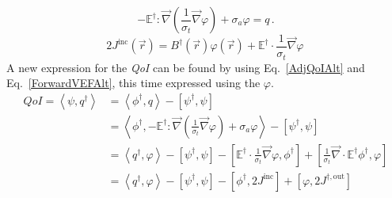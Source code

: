 \documentclass[12pt]{report}
\newcommand{\vr}{\vec{r}}
\newcommand{\bra}{\left\langle}
\newcommand{\ket}{\right\rangle}
\newcommand{\sbra}{\left[}
\newcommand{\sket}{\right]}
\renewcommand{\div}{\vec{\nabla} \cdot}
\newcommand{\grad}{\vec{\nabla}}
\newcommand{\Edd}{\mathbb{E}}
\newcommand{\BEdd}{B}
\newcommand{\sigt}{\sigma_t}
\newcommand{\siga}{\sigma_a}
\newcommand{\angSource}{q}
\newcommand{\scalSource}{q}
\newcommand{\qoi}{{\it QoI}\xspace}
\begin{document}
\begin{equation}
\label{ForwardVEFAlt}
- \Edd^\dag : \grad \left( \frac{1}{\sigt}\grad \varphi \right) + \siga \varphi  = \scalSource  \,.
\end{equation}
\begin{equation}
2 J^{\text{inc}}(\vr) = \BEdd^\dag(\vr) \varphi(\vr) + \Edd^\dag \cdot \frac{1}{\sigt} \grad \varphi  \,
\end{equation} 
A new expression for the \qoi can be found by using Eq.~\eqref{AdjQoIAlt} and Eq.~\eqref{ForwardVEFAlt}, this time expressed using the $\varphi$.
 \begin{equation}
\label{AdjQoIAltExpand}
\begin{split}
QoI = \bra \psi , \angSource^\dag \ket &= \bra \phi^\dag , \angSource \ket - \sbra \psi^\dag,  \psi \sket \\
&= \bra \phi^\dag , - \Edd^\dag : \grad \left( \frac{1}{\sigt}\grad \varphi \right) + \siga \varphi \ket - \sbra \psi^\dag,  \psi \sket \\
&= \bra q^\dag ,\varphi \ket - \sbra \psi^\dag,  \psi \sket  
- \sbra \Edd^\dag \cdot \frac{1}{\sigt}\grad \varphi,  \phi^\dag \sket 
+ \sbra \frac{1}{\sigt} \div \Edd^\dag \phi^\dag,  \varphi \sket \\
&=  \bra q^\dag ,\varphi \ket - \sbra \psi^\dag,  \psi \sket - \sbra \phi^\dag, 2J^{\text{inc}} \sket + \sbra \varphi , 2 J^{\dag,\text{out}} \sket
\end{split}
\end{equation}
\end{document}
